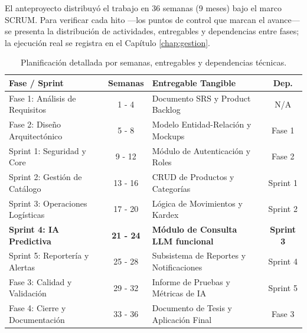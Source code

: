 

El anteproyecto distribuyó el trabajo en 36 semanas (9 meses) bajo el marco SCRUM. Para verificar cada hito ---los puntos de control que marcan el avance--- se presenta la distribución de actividades, entregables y dependencias entre fases; la ejecución real se registra en el Capítulo \ref{chap:gestion}.

\begin{table}[H]
\centering
\small
\renewcommand{\arraystretch}{1.3}
\begin{tabular}{|p{4.8cm}|c|p{4.8cm}|c|}
\hline
\rowcolor[gray]{0.9} \textbf{Fase / Sprint} & \textbf{Semanas} & \textbf{Entregable Tangible} & \textbf{Dep.} \\ \hline
Fase 1: Análisis de Requisitos & 1 - 4 & Documento SRS y Product Backlog & N/A \\ \hline
Fase 2: Diseño Arquitectónico & 5 - 8 & Modelo Entidad-Relación y Mockups & Fase 1 \\ \hline
Sprint 1: Seguridad y Core & 9 - 12 & Módulo de Autenticación y Roles & Fase 2 \\ \hline
Sprint 2: Gestión de Catálogo & 13 - 16 & CRUD de Productos y Categorías & Sprint 1 \\ \hline
Sprint 3: Operaciones Logísticas & 17 - 20 & Lógica de Movimientos y Kardex & Sprint 2 \\ \hline
\textbf{Sprint 4: IA Predictiva} & \textbf{21 - 24} & \textbf{Módulo de Consulta LLM funcional} & \textbf{Sprint 3} \\ \hline
Sprint 5: Reportería y Alertas & 25 - 28 & Subsistema de Reportes y Notificaciones & Sprint 4 \\ \hline
Fase 3: Calidad y Validación & 29 - 32 & Informe de Pruebas y Métricas de IA & Sprint 5 \\ \hline
Fase 4: Cierre y Documentación & 33 - 36 & Documento de Tesis y Aplicación Final & Fase 3 \\ \hline
\end{tabular}
\caption{Planificación detallada por semanas, entregables y dependencias técnicas.}
\label{tab:cronograma_semanal}
\end{table}

\vspace{1cm}

